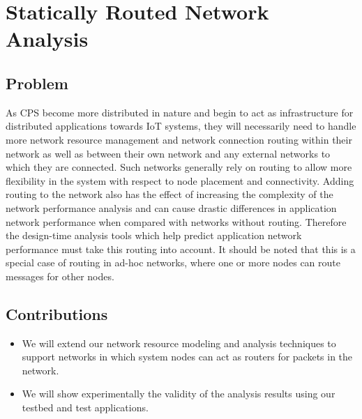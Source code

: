 \newpage

\section{Statically Routed Network Analysis}
\label{sec:staticRoute}

\subsection{Problem}
As CPS become more distributed in nature and begin to act as
infrastructure for distributed applications towards IoT systems, they
will necessarily need to handle more network resource management and
network connection routing within their network as well as between
their own network and any external networks to which they are
connected.  Such networks generally rely on routing to allow more
flexibility in the system with respect to node placement and
connectivity.  Adding routing to the network also has the effect of
increasing the complexity of the network performance analysis and can
cause drastic differences in application network performance when
compared with networks without routing.  Therefore the design-time
analysis tools which help predict application network performance must
take this routing into account.  It should be noted that this is a
special case of routing in ad-hoc networks, where one or more nodes
can route messages for other nodes.

\subsection{Contributions}
\begin{itemize}
	\item We will extend our network resource modeling and
          analysis techniques to support networks in which system
          nodes can act as routers for packets in the network.
	\item We will show experimentally the validity of the analysis
          results using our testbed and test applications.
\end{itemize}

